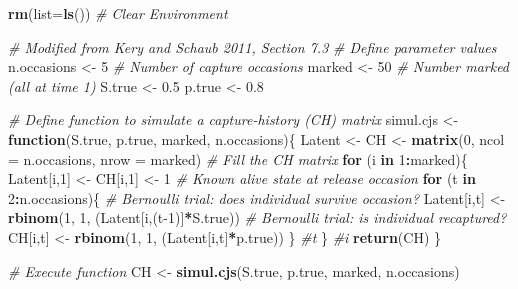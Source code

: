 \documentclass[
]{krantz}
\makeatletter
\newenvironment{Shaded}{\begin{snugshade}}{\end{snugshade}}
\newcommand{\AttributeTok}[1]{\textcolor[rgb]{0.27,0.27,0.27}{#1}}
\newcommand{\CommentTok}[1]{\textcolor[rgb]{0.37,0.37,0.37}{\textit{#1}}}
\newcommand{\ControlFlowTok}[1]{\textcolor[rgb]{0.27,0.27,0.27}{\textbf{#1}}}
\newcommand{\DecValTok}[1]{\textcolor[rgb]{0.06,0.06,0.06}{#1}}
\newcommand{\FloatTok}[1]{\textcolor[rgb]{0.06,0.06,0.06}{#1}}
\newcommand{\FunctionTok}[1]{\textcolor[rgb]{0.27,0.27,0.27}{\textbf{#1}}}
\newcommand{\NormalTok}[1]{#1}
\newcommand{\OtherTok}[1]{\textcolor[rgb]{0.37,0.37,0.37}{#1}}
\newcommand{\SpecialCharTok}[1]{\textcolor[rgb]{0.43,0.43,0.43}{\textbf{#1}}}
\newenvironment{kframe}{%
\medskip{}
\setlength{\fboxsep}{.8em}
 \def\at@end@of@kframe{}%
 \ifinner\ifhmode%
  \def\at@end@of@kframe{\end{minipage}}%
  \begin{minipage}{\columnwidth}%
 \fi\fi%
 \def\FrameCommand##1{\hskip\@totalleftmargin \hskip-\fboxsep
 \colorbox{shadecolor}{##1}\hskip-\fboxsep
     \hskip-\linewidth \hskip-\@totalleftmargin \hskip\columnwidth}%
 \MakeFramed {\advance\hsize-\width
   \@totalleftmargin\z@ \linewidth\hsize
   \@setminipage}}%
 {\par\unskip\endMakeFramed%
 \at@end@of@kframe}
\renewenvironment{Shaded}{\begin{kframe}}{\end{kframe}}
\makeatother
\begin{document}
\begin{Shaded}
\begin{Highlighting}[]
\FunctionTok{rm}\NormalTok{(}\AttributeTok{list=}\FunctionTok{ls}\NormalTok{()) }\CommentTok{\# Clear Environment}

\CommentTok{\# Modified from Kery and Schaub 2011, Section 7.3}
\CommentTok{\# Define parameter values}
\NormalTok{n.occasions }\OtherTok{\textless{}{-}} \DecValTok{5}            \CommentTok{\# Number of capture occasions}
\NormalTok{marked }\OtherTok{\textless{}{-}} \DecValTok{50}                \CommentTok{\# Number marked (all at time 1)}
\NormalTok{S.true }\OtherTok{\textless{}{-}} \FloatTok{0.5}
\NormalTok{p.true }\OtherTok{\textless{}{-}} \FloatTok{0.8}

\CommentTok{\# Define function to simulate a capture{-}history (CH) matrix}
\NormalTok{simul.cjs }\OtherTok{\textless{}{-}} \ControlFlowTok{function}\NormalTok{(S.true, p.true, marked, n.occasions)\{}
\NormalTok{  Latent }\OtherTok{\textless{}{-}}\NormalTok{ CH }\OtherTok{\textless{}{-}} \FunctionTok{matrix}\NormalTok{(}\DecValTok{0}\NormalTok{, }\AttributeTok{ncol =}\NormalTok{ n.occasions, }\AttributeTok{nrow =}\NormalTok{ marked)}
  \CommentTok{\# Fill the CH matrix}
  \ControlFlowTok{for}\NormalTok{ (i }\ControlFlowTok{in} \DecValTok{1}\SpecialCharTok{:}\NormalTok{marked)\{}
\NormalTok{    Latent[i,}\DecValTok{1}\NormalTok{] }\OtherTok{\textless{}{-}}\NormalTok{ CH[i,}\DecValTok{1}\NormalTok{] }\OtherTok{\textless{}{-}} \DecValTok{1}    \CommentTok{\# Known alive state at release occasion}
    \ControlFlowTok{for}\NormalTok{ (t }\ControlFlowTok{in} \DecValTok{2}\SpecialCharTok{:}\NormalTok{n.occasions)\{}
      \CommentTok{\# Bernoulli trial: does individual survive occasion?}
\NormalTok{      Latent[i,t] }\OtherTok{\textless{}{-}} \FunctionTok{rbinom}\NormalTok{(}\DecValTok{1}\NormalTok{, }\DecValTok{1}\NormalTok{, (Latent[i,(t}\DecValTok{{-}1}\NormalTok{)]}\SpecialCharTok{*}\NormalTok{S.true))}
      \CommentTok{\# Bernoulli trial: is individual recaptured?}
\NormalTok{      CH[i,t] }\OtherTok{\textless{}{-}} \FunctionTok{rbinom}\NormalTok{(}\DecValTok{1}\NormalTok{, }\DecValTok{1}\NormalTok{, (Latent[i,t]}\SpecialCharTok{*}\NormalTok{p.true))}
\NormalTok{    \} }\CommentTok{\#t}
\NormalTok{  \} }\CommentTok{\#i}
  \FunctionTok{return}\NormalTok{(CH)}
\NormalTok{\}}

\CommentTok{\# Execute function}
\NormalTok{CH }\OtherTok{\textless{}{-}} \FunctionTok{simul.cjs}\NormalTok{(S.true, p.true, marked, n.occasions)}
\end{Highlighting}
\end{Shaded}
\end{document}
